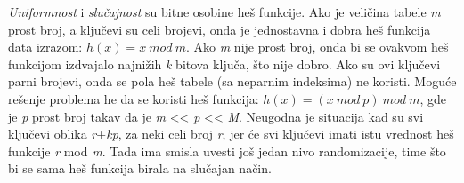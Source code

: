 \documentclass{article}
\begin{document}
\newline
\textit{Uniformnost} i \textit{slučajnost} su bitne osobine  heš funkcije. 
\newline
Ako je veličina tabele \textit{m} prost broj, a ključevi su celi brojevi, onda je jednostavna i dobra heš funkcija data izrazom:
$h(x) = x\ mod\ m$. 
\newline
Ako \textit{m} nije prost broj, onda bi se ovakvom heš funkcijom izdvajalo najnižih \textit{k} bitova ključa, što nije dobro. Ako su ovi ključevi parni brojevi, onda se pola heš tabele (sa neparnim indeksima) ne koristi. Moguće rešenje problema he da se koristi heš funkcija:
$h(x) = (x\ mod\ p)\ mod\ m$, gde je \textit{p} prost broj takav da je \textit{m} << \textit{p} << \textit{M}.
\newline
Neugodna je situacija kad su svi ključevi oblika \textit{r}+\textit{kp}, za neki celi broj \textit{r}, jer će svi ključevi imati istu vrednost heš funkcije \textit{r} mod \textit{m}. Tada ima smisla uvesti još jedan nivo randomizacije, time što bi se sama heš funkcija birala na slučajan način. 
\end{document}

